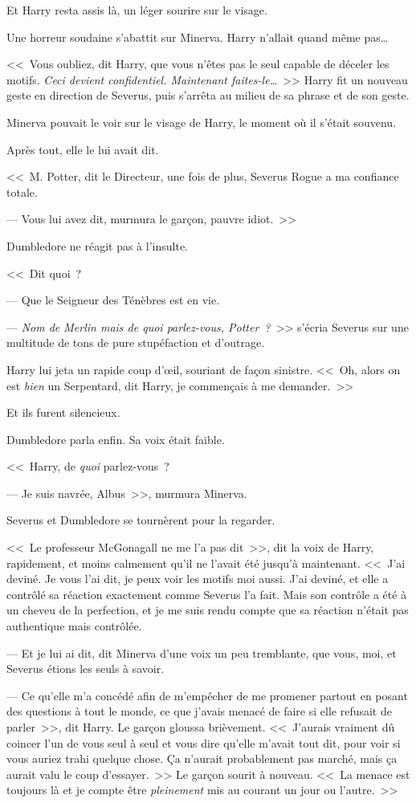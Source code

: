 Et Harry resta assis là, un léger sourire sur le visage.

Une horreur soudaine s'abattit sur Minerva. Harry n'allait quand même pas…

<<~Vous oubliez, dit Harry, que vous n'êtes pas le seul capable de déceler les motifs. \emph{Ceci devient confidentiel. Maintenant faites-le…}~>> Harry fit un nouveau geste en direction de Severus, puis s'arrêta au milieu de sa phrase et de son geste.

Minerva pouvait le voir sur le visage de Harry, le moment où il s'était souvenu.

Après tout, elle le lui avait dit.

<<~M. Potter, dit le Directeur, une fois de plus, Severus Rogue a ma confiance totale.

--- Vous lui avez dit, murmura le garçon, pauvre idiot.~>>

Dumbledore ne réagit pas à l'insulte.

<<~Dit quoi~?

--- Que le Seigneur des Ténèbres est en vie.

--- \emph{Nom de Merlin mais de quoi parlez-vous, Potter~?}~>> s'écria Severus sur une multitude de tons de pure stupéfaction et d'outrage.

Harry lui jeta un rapide coup d'œil, souriant de façon sinistre. <<~Oh, alors on est \emph{bien} un Serpentard, dit Harry, je commençais à me demander.~>>

Et ils furent silencieux.

Dumbledore parla enfin. Sa voix était faible.

<<~Harry, de \emph{quoi} parlez-vous~?

--- Je suis navrée, Albus~>>, murmura Minerva.

Severus et Dumbledore se tournèrent pour la regarder.

<<~Le professeur McGonagall ne me l'a pas dit~>>, dit la voix de Harry, rapidement, et moins calmement qu'il ne l'avait été jusqu'à maintenant. <<~J'ai deviné. Je vous l'ai dit, je peux voir les motifs moi aussi. J'ai deviné, et elle a contrôlé sa réaction exactement comme Severus l'a fait. Mais son contrôle a été à un cheveu de la perfection, et je me suis rendu compte que sa réaction n'était pas authentique mais contrôlée.

--- Et je lui ai dit, dit Minerva d'une voix un peu tremblante, que vous, moi, et Severus étions les seuls à savoir.

--- Ce qu'elle m'a concédé afin de m'empêcher de me promener partout en posant des questions à tout le monde, ce que j'avais menacé de faire si elle refusait de parler~>>, dit Harry. Le garçon gloussa brièvement. <<~J'aurais vraiment dû coincer l'un de vous seul à seul et vous dire qu'elle m'avait tout dit, pour voir si vous auriez trahi quelque chose. Ça n'aurait probablement pas marché, mais ça aurait valu le coup d'essayer.~>> Le garçon sourit à nouveau. <<~La menace est toujours là et je compte être \emph{pleinement} mis au courant un jour ou l'autre.~>>

